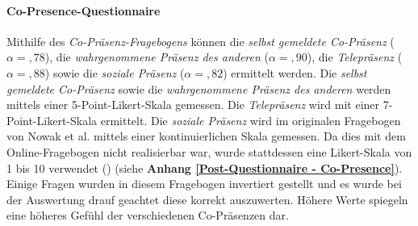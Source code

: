 \documentclass[a4paper,11pt]{article}%
\renewcommand{\\}{\vspace*{0.5\baselineskip} \newline}
\begin{document}
		\paragraph{Co-Presence-Questionnaire}
Mithilfe des \textit{Co-Präsenz-Fragebogens} können die \textit{selbst gemeldete Co-Präsenz} ($\alpha =,78$), die \textit{wahrgenommene Präsenz des anderen} ($\alpha =,90$), die \textit{Telepräsenz} ($\alpha =,88$) sowie die \textit{soziale Präsenz} ($\alpha =,82$) ermittelt werden. Die \textit{selbst gemeldete Co-Präsenz} sowie die \textit{wahrgenommene Präsenz des anderen} werden mittels einer 5-Point-Likert-Skala gemessen. Die \textit{Telepräsenz} wird mit einer 7-Point-Likert-Skala ermittelt. Die \textit{soziale Präsenz} wird im originalen Fragebogen von Nowak et al. mittels einer kontinuierlichen Skala gemessen. Da dies mit dem Online-Fragebogen nicht realisierbar war, wurde stattdessen eine Likert-Skala von 1 bis 10 verwendet (\citep[S. 487]{nowak2003effect}) (siehe \textbf{Anhang \ref{Post-Questionnaire - Co-Presence}}). Einige Fragen wurden in diesem Fragebogen invertiert gestellt und es wurde bei der Auswertung drauf geachtet diese korrekt auszuwerten. Höhere Werte spiegeln eine höheres Gefühl der verschiedenen Co-Präsenzen dar.
\clearpage
\newpage
\end{document}

